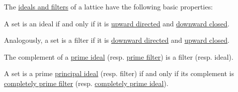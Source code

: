 \begin{proposition}\label{thm:def:lattice_ideal}
  The \hyperref[def:lattice_ideal]{ideals and filters} of a lattice have the following basic properties:
  \begin{thmenum}
     A set is an ideal if and only if it is \hyperref[def:directed_set]{upward directed} and \hyperref[def:closed_ordered_subset]{downward closed}.

    Analogously, a set is a filter if it is \hyperref[def:directed_set]{downward directed} and \hyperref[def:closed_ordered_subset]{upward closed}.

     The complement of a \hyperref[def:lattice_ideal/prime]{prime ideal} (resp. \hyperref[def:lattice_ideal/prime]{prime filter}) is a filter (resp. ideal).

     A set is a prime \hyperref[def:lattice_ideal/principal]{principal ideal} (resp. filter) if and only if its complement is \hyperref[def:lattice_ideal/prime]{completely prime filter} (resp. \hyperref[def:lattice_ideal/prime]{completely prime ideal}).
  \end{thmenum}
\end{proposition}
